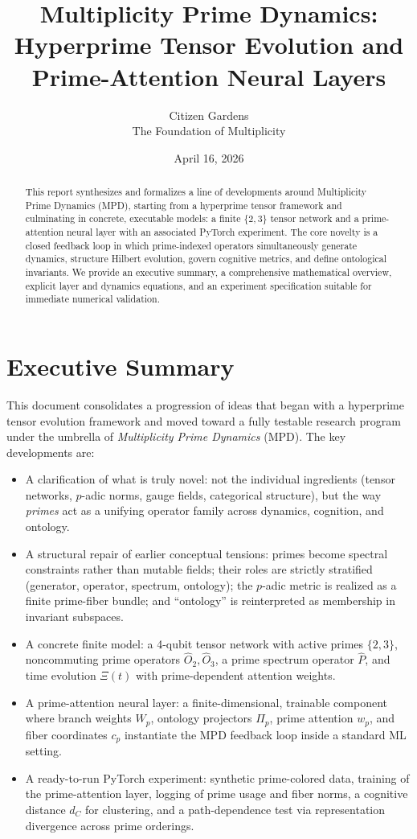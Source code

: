\documentclass[11pt]{article}
\title{Multiplicity Prime Dynamics:\\
Hyperprime Tensor Evolution and Prime-Attention Neural Layers}
\author{Citizen Gardens \\ The Foundation of Multiplicity}
\date{April 16, 2026}
\begin{document}
\maketitle

\begin{abstract}
This report synthesizes and formalizes a line of developments around Multiplicity Prime Dynamics (MPD), starting from a hyperprime tensor framework and culminating in concrete, executable models: a finite $\{2,3\}$ tensor network and a prime-attention neural layer with an associated PyTorch experiment. The core novelty is a closed feedback loop in which prime-indexed operators simultaneously generate dynamics, structure Hilbert evolution, govern cognitive metrics, and define ontological invariants. We provide an executive summary, a comprehensive mathematical overview, explicit layer and dynamics equations, and an experiment specification suitable for immediate numerical validation.
\end{abstract}
\newpage
\tableofcontents
\newpage
\section{Executive Summary}

This document consolidates a progression of ideas that began with a hyperprime tensor evolution framework and moved toward a fully testable research program under the umbrella of \emph{Multiplicity Prime Dynamics} (MPD). The key developments are:

\begin{itemize}[nosep]
  \item A clarification of what is truly novel: not the individual ingredients (tensor networks, $p$-adic norms, gauge fields, categorical structure), but the way \emph{primes} act as a unifying operator family across dynamics, cognition, and ontology.
  \item A structural repair of earlier conceptual tensions: primes become spectral constraints rather than mutable fields; their roles are strictly stratified (generator, operator, spectrum, ontology); the $p$-adic metric is realized as a finite prime-fiber bundle; and ``ontology'' is reinterpreted as membership in invariant subspaces.
  \item A concrete finite model: a 4-qubit tensor network with active primes $\{2,3\}$, noncommuting prime operators $\hat{O}_2,\hat{O}_3$, a prime spectrum operator $\hat{P}$, and time evolution $\Xi(t)$ with prime-dependent attention weights.
  \item A prime-attention neural layer: a finite-dimensional, trainable component where branch weights $W_p$, ontology projectors $\Pi_p$, prime attention $w_p$, and fiber coordinates $c_p$ instantiate the MPD feedback loop inside a standard ML setting.
  \item A ready-to-run PyTorch experiment: synthetic prime-colored data, training of the prime-attention layer, logging of prime usage and fiber norms, a cognitive distance $d_C$ for clustering, and a path-dependence test via representation divergence across prime orderings.
\end{itemize}
\end{document}
